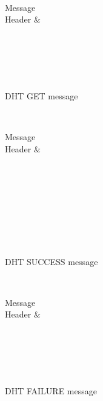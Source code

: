 \documentclass[a4paper, 11pt]{article}
\begin{document}
\begin{figure}[h!]
	\centering
	\begin{bytefield}[bitwidth=0.8em]{32}
		 \\
		\begin{rightwordgroup}{Message \\  Header}
			 & 
		\end{rightwordgroup} \\
		 \\
		\skippedwords \\
		 \\
	\end{bytefield}
	\caption{DHT GET message}
	\label{DHTGET}
\end{figure}

\begin{figure}[h!]
	\centering
	\begin{bytefield}[bitwidth=0.8em]{32}
		 \\
		\begin{rightwordgroup}{Message \\  Header}
			 & 
		\end{rightwordgroup} \\
		 \\
		\skippedwords \\
		 \\
		 \\
		\skippedwords \\
		 \\
	\end{bytefield}
	\caption{DHT SUCCESS message}
	\label{DHTSUCCESS}
\end{figure}

\begin{figure}[h!]
	\centering
	\begin{bytefield}[bitwidth=0.8em]{32}
		 \\
		\begin{rightwordgroup}{Message \\  Header}
			 & 
		\end{rightwordgroup} \\
		 \\
		\skippedwords \\
		 \\
	\end{bytefield}
	\caption{DHT FAILURE message}
	\label{DHTFAILURE}
\end{figure}
\end{document}
